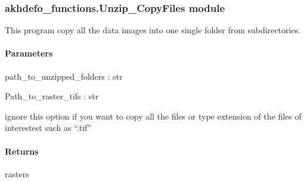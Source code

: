 \documentclass[letterpaper,10pt,english]{sphinxmanual}
\begin{document}
\subsubsection{akhdefo\_functions.Unzip\_CopyFiles module}
\label{\detokenize{akhdefo_functions:module-akhdefo_functions.Unzip_CopyFiles}}\label{\detokenize{akhdefo_functions:akhdefo-functions-unzip-copyfiles-module}}

\begin{fulllineitems}
\label{\detokenize{akhdefo_functions:akhdefo_functions.Unzip_CopyFiles.copyImage_Data}}
\pysigstartsignatures
{}
\pysigstopsignatures
\sphinxAtStartPar
This program copy all the data images into one single folder from subdirectories.


\paragraph{Parameters}
\label{\detokenize{akhdefo_functions:id39}}
\sphinxAtStartPar
path\_to\_unzipped\_folders : str

\sphinxAtStartPar
Path\_to\_raster\_tifs : str
\begin{description}
\sphinxAtStartPar
ignore this option if you want to copy all the files or
type extension of the files of interestest such as “.tif”

\end{description}


\paragraph{Returns}
\label{\detokenize{akhdefo_functions:id40}}
\sphinxAtStartPar
rasters

\end{fulllineitems}
\end{document}
